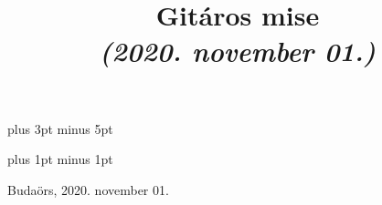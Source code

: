 \documentclass[a5paper,twoside]{article}
\title{Gitáros mise\\\textit{(2020. november 01.)}}
\date{}
\renewcommand{\_}[1]{\underline{#1}} %
\begin{document}

  \begin{titlepage}
    \setlength{\oddsidemargin}{-1.625cm}

    \vspace*{4cm}
    {\let\newpage\relax\maketitle}
  \end{titlepage}

  \versesep=12pt plus 3pt minus 5pt

  \iflyric
    \baselineadj=2pt plus 1pt minus 1pt
  \fi


  \begin{songs}{}
    
    






    

    

    
  \end{songs}
  \newpage
  \thispagestyle{empty}

  \vspace*{\fill}
  
  Budaörs, 2020. november 01.
\end{document}

